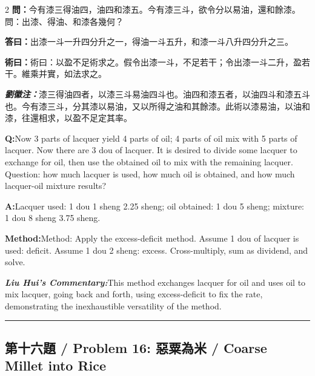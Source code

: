 \documentclass[11pt,a4paper]{article}
\newcommand{\cnwen}{\textcolor{cnlabelfg}{\textbf{問：}}}
\newcommand{\cnda}{\textbf{答曰：}}
\newcommand{\cnshu}{\textcolor{cnlabelfg}{\textbf{術曰：}}}
\newcommand{\cnzhu}{\textcolor{commentarycolor}{\textit{\textbf{劉徽注：}}}}
\newcommand{\enwen}{\textcolor{enlabelfg}{\textbf{Q:}}}
\newcommand{\enda}{\textcolor{enlabelfg}{\textbf{A:}}}
\newcommand{\enshu}{\textcolor{enlabelfg}{\textbf{Method:}}}
\newcommand{\enzhu}{\textcolor{enlabelfg}{\textit{\textbf{Liu Hui's Commentary:}}}}
\begin{document}
\begin{paracol}{2}
\switchcolumn[0]
\cnwen 今有漆三得油四，油四和漆五。今有漆三斗，欲令分以易油，還和餘漆。問：出漆、得油、和漆各幾何？

\cnda 出漆一斗一升四分升之一，得油一斗五升，和漆一斗八升四分升之三。

\cnshu 術曰：以盈不足術求之。假令出漆一斗，不足若干；令出漆一斗二升，盈若干。維乘并實，如法求之。

\cnzhu 漆三得油四者，以漆三斗易油四斗也。油四和漆五者，以油四斗和漆五斗也。今有漆三斗，分其漆以易油，又以所得之油和其餘漆。此術以漆易油，以油和漆，往還相求，以盈不足定其率。

\switchcolumn[1]
\enwen Now 3 parts of lacquer yield 4 parts of oil; 4 parts of oil mix with 5 parts of lacquer. Now there are 3 dou of lacquer. It is desired to divide some lacquer to exchange for oil, then use the obtained oil to mix with the remaining lacquer. Question: how much lacquer is used, how much oil is obtained, and how much lacquer-oil mixture results?

\enda Lacquer used: 1 dou 1 sheng 2.25 sheng; oil obtained: 1 dou 5 sheng; mixture: 1 dou 8 sheng 3.75 sheng.

\enshu Method: Apply the excess-deficit method. Assume 1 dou of lacquer is used: deficit. Assume 1 dou 2 sheng: excess. Cross-multiply, sum as dividend, and solve.

\enzhu This method exchanges lacquer for oil and uses oil to mix lacquer, going back and forth, using excess-deficit to fix the rate, demonstrating the inexhaustible versatility of the method.
\end{paracol}

\bigskip\hrule\bigskip

\subsection{第十六題 / Problem 16: 惡粟為米 / Coarse Millet into Rice}
\end{document}
